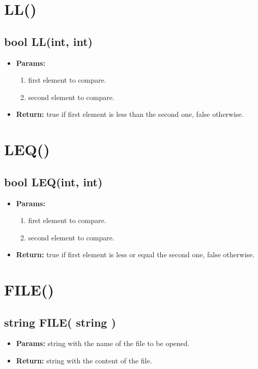 \documentclass[11pt,a4paper]{article}
\begin{document}
\section*{LL()}
\begin{framed}
\subsection*{bool LL(int, int)}
\begin{itemize}
\item \textbf{Params:}
\begin{enumerate}
\item first element to compare.
\item second element to compare.
\end{enumerate}
\item \textbf{Return:} true if first element is less than the second one, false otherwise.
\end{itemize}
\end{framed}

\section*{LEQ()}
\begin{framed}
\subsection*{bool LEQ(int, int)}
\begin{itemize}
\item \textbf{Params:}
\begin{enumerate}
\item first element to compare.
\item second element to compare.
\end{enumerate}
\item \textbf{Return:} true if first element is less or equal the second one, false otherwise.
\end{itemize}
\end{framed}

\section*{FILE()}
\begin{framed}
\subsection*{string FILE( string )}
\begin{itemize}
\item \textbf{Params:} string with the name of the file to be opened.
\item \textbf{Return:} string with the content of the file.
\end{itemize}
\end{framed}
\end{document}
